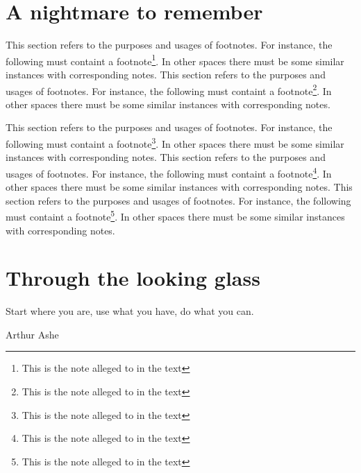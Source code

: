 \chapter{A nightmare to remember}

\newcommand{\afootnote}{This section refers to the purposes and usages of footnotes. For instance, the following must containt a footnote\footnote{This is the note alleged to in the text}. In other spaces there must be some similar instances with corresponding notes.}

\afootnote
{}
\lipsum[1-5]
\afootnote

\lipsum[6-8]
\afootnote
{}
\afootnote
{}
\afootnote
\lipsum[9-12]
\chapter{Through the looking glass}
\epigraph{Start where you are, use what you have, do what you can.}{Arthur Ashe}
\lipsum[25-26]
\lipsum[27-50]